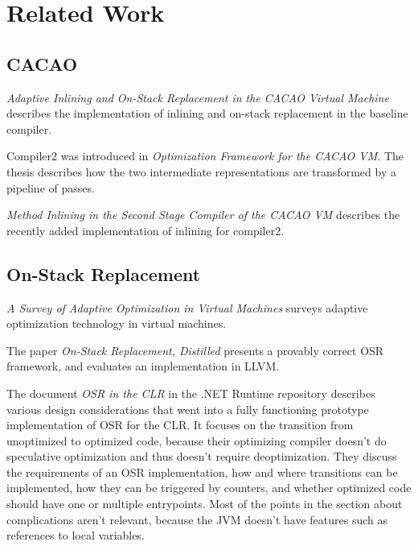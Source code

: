 \documentclass[draft,final]{vutinfth} %
\begin{document}
    \chapter{Related Work}


    \section{CACAO}

    \textit{Adaptive Inlining and On-Stack Replacement in the CACAO Virtual Machine}\cite{10.1145/1294325.1294356}
    describes the implementation of inlining and on-stack replacement in the baseline compiler.

    Compiler2 was introduced in \textit{Optimization Framework for the CACAO VM}\cite{EislJosef2013Offt}.
    The thesis describes how the two intermediate representations are transformed by a pipeline of passes.

    \textit{Method Inlining in the Second Stage Compiler of the CACAO VM}\cite{MethodInlining} describes the recently added implementation of inlining for compiler2.


    \section{On-Stack Replacement}


    \textit{A Survey of Adaptive Optimization in Virtual Machines}\cite{AdapOptSurvey} surveys adaptive optimization technology in virtual machines.

    The paper \textit{On-Stack Replacement, Distilled}\cite{10.1145/3192366.3192396} presents a provably correct OSR framework,
    and evaluates an implementation in LLVM.

    The document \textit{OSR in the CLR}\cite{CLR-OSR} in the .NET Runtime repository describes various design considerations that
    went into a fully functioning prototype implementation of OSR for the CLR.
    It focuses on the transition from unoptimized to optimized code, because their optimizing
    compiler doesn't do speculative optimization and thus doesn't require deoptimization.
    They discuss the requirements of an OSR implementation,
    how and where transitions can be implemented,
    how they can be triggered by counters,
    and whether optimized code should have one or multiple entrypoints.
    Most of the points in the section about complications aren't relevant,
    because the JVM doesn't have features such as references to local variables.
\end{document}
